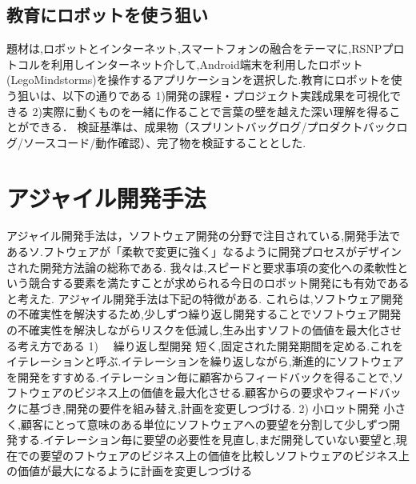 \documentclass[paper]{jrsj}
\begin{document}
\subsection{教育にロボットを使う狙い}
題材は,ロボットとインターネット,スマートフォンの融合をテーマに,RSNPプロトコルを利用しインターネット介して,Android端末を利用したロボット(LegoMindstorms)を操作するアプリケーションを選択した.教育にロボットを使う狙いは、以下の通りである
1)開発の課程・プロジェクト実践成果を可視化できる
2)実際に動くものを一緒に作ることで言葉の壁を越えた深い理解を得ることができる．
検証基準は、成果物（スプリントバッグログ/プロダクトバックログ/ソースコード/動作確認）、完了物を検証することとした.

\section{アジャイル開発手法}
アジャイル開発手法は，ソフトウェア開発の分野で注目されている,開発手法であるソ.フトウェアが「柔軟で変更に強く」なるように開発プロセスがデザインされた開発方法論の総称である.   
我々は,スピードと要求事項の変化への柔軟性という競合する要素を満たすことが求められる今日のロボット開発にも有効であると考えた. 
アジャイル開発手法は下記の特徴がある. これらは,ソフトウェア開発の不確実性を解決するため,少しずつ繰り返し開発することでソフトウェア開発の不確実性を解決しながらリスクを低減し,生み出すソフトの価値を最大化させる考え方である
1)　 繰り返し型開発
短く,固定された開発期間を定める.これをイテレーションと呼ぶ.イテレーションを繰り返しながら,漸進的にソフトウェアを開発をすすめる.イテレーション毎に顧客からフィードバックを得ることで,ソフトウェアのビジネス上の価値を最大化させる.顧客からの要求やフィードバックに基づき,開発の要件を組み替え,計画を変更しつづける.
2)	小ロット開発
小さく,顧客にとって意味のある単位にソフトウェアへの要望を分割して少しずつ開発する.イテレーション毎に要望の必要性を見直し,まだ開発していない要望と,現在での要望のフトウェアのビジネス上の価値を比較しソフトウェアのビジネス上の価値が最大になるように計画を変更しつづける
\end{document}
